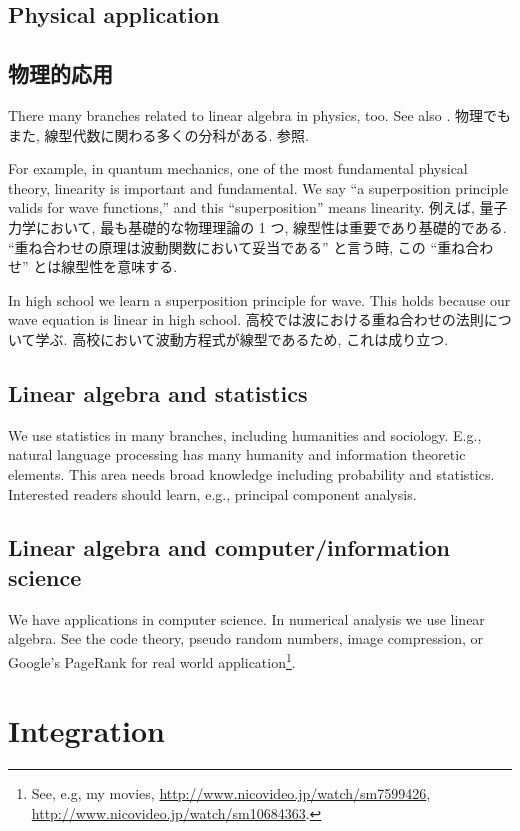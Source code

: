 \documentclass[openany, a4paper, oneside]{jsbook}
\theoremstyle{break}
\theoremstyle{breakdefn}
\begin{document}
\subsection{Physical application}
\subsection{物理的応用}


There many branches related to linear algebra in physics, too.
See also \cite{phasetr2}.
物理でもまた, 線型代数に関わる多くの分科がある.
\cite{phasetr2} 参照.

For example, in quantum mechanics, one of the most fundamental physical theory,
linearity is important and fundamental.
We say ``a superposition principle valids for wave functions,''
and this ``superposition'' means linearity.
例えば, 量子力学において, 最も基礎的な物理理論の 1 つ,
線型性は重要であり基礎的である.
``重ね合わせの原理は波動関数において妥当である'' と言う時,
この ``重ね合わせ'' とは線型性を意味する.

In high school we learn a superposition principle for wave.
This holds because our wave equation is linear in high school.
高校では波における重ね合わせの法則について学ぶ.
高校において波動方程式が線型であるため, これは成り立つ.
\subsection{Linear algebra and statistics}


We use statistics in many branches, including humanities and sociology.
E.g., natural language processing has many humanity and information theoretic elements.
This area needs broad knowledge including probability and statistics.
Interested readers should learn, e.g., principal component analysis.
\subsection{Linear algebra and computer/information science}


We have applications in computer science.
In numerical analysis we use linear algebra.
See the code theory, pseudo random numbers, image compression, or Google's
PageRank for real world application\footnote{See, e.g, my movies,
\href{http://www.nicovideo.jp/watch/sm7599426}{http://www.nicovideo.jp/watch/sm7599426}, \href{http://www.nicovideo.jp/watch/sm10684363}{http://www.nicovideo.jp/watch/sm10684363}.
 }.
\section{Integration}
\end{document}

